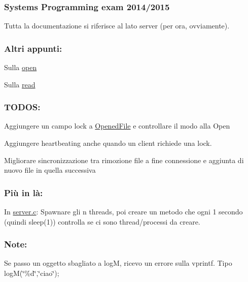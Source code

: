 \subsubsection*{Systems Programming exam 2014/2015}

Tutta la documentazione si riferisce al lato server (per ora, ovviamente). \subsubsection*{Altri appunti\+:}


\begin{DoxyItemize}
\item Sulla \hyperlink{md_OPE}{open}
\item Sulla \hyperlink{md_READ}{read}
\end{DoxyItemize}

\subsubsection*{T\+O\+D\+O\+S\+:}


\begin{DoxyItemize}
\item Aggiungere un campo lock a \hyperlink{structOpenedFile}{Opened\+File} e controllare il modo alla Open
\item Aggiungere heartbeating anche quando un client richiede una lock.
\item Migliorare sincronizzazione tra rimozione file a fine connessione e aggiunta di nuovo file in quella successiva
\end{DoxyItemize}

\subsubsection*{Più in là\+:}


\begin{DoxyItemize}
\item In \hyperlink{server_8c}{server.\+c}\+: Spawnare gli n threads, poi creare un metodo che ogni 1 secondo (quindi sleep(1)) controlla se ci sono thread/processi da creare.
\end{DoxyItemize}

\subsubsection*{Note\+:}


\begin{DoxyItemize}
\item Se passo un oggetto sbagliato a log\+M, ricevo un errore sulla vprintf. Tipo log\+M(\char`\"{}\%d\char`\"{},\char`\"{}ciao\char`\"{}); 
\end{DoxyItemize}